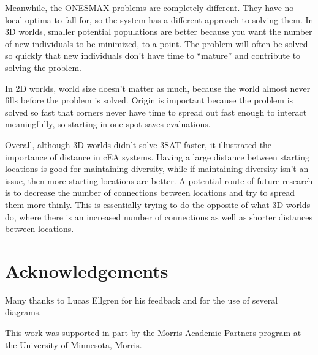 \documentclass[12pt]{article}
\begin{document}
Meanwhile, the ONESMAX problems are completely different. They have no local optima to fall for, so the system has a different approach to solving them. In 3D worlds, smaller potential populations are better because you want the number of new individuals to be minimized, to a point. The problem will often be solved so quickly that new individuals don't have time to ``mature'' and contribute to solving the problem.

In 2D worlds, world size doesn't matter as much, because the world almost never fills before the problem is solved. Origin is important because the problem is solved so fast that corners never have time to spread out fast enough to interact meaningfully, so starting in one spot saves evaluations.       

Overall, although 3D worlds didn't solve 3SAT faster, it illustrated the importance of distance in cEA systems. Having a large distance between starting locations is good for maintaining diversity, while if maintaining diversity isn't an issue, then more starting locations are better. A potential route of future research is to decrease the number of connections between locations and try to spread them more thinly. This is essentially trying to do the opposite of what 3D worlds do, where there is an increased number of connections as well as shorter distances between locations.

\section*{Acknowledgements}

Many thanks to Lucas Ellgren for his feedback and for the use of several diagrams.

This work was supported in part by the Morris Academic Partners program at the University of Minnesota, Morris.



\end{document}
